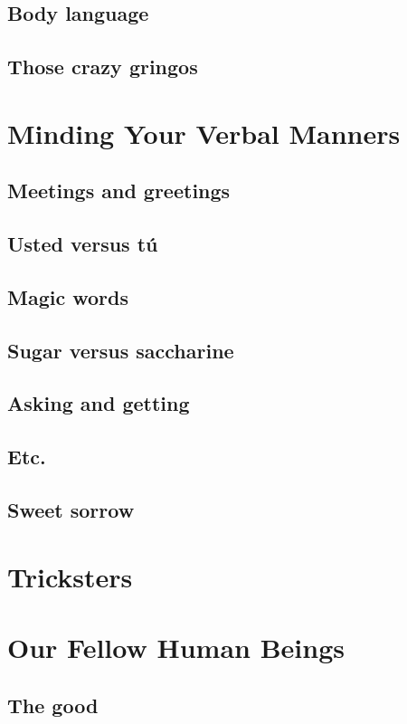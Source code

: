 \section{Body language}
\section{Those crazy gringos}

\chapter{Minding Your Verbal Manners}

\section{Meetings and greetings}
\section{Usted versus tú}
\section{Magic words}
\section{Sugar versus saccharine}
\section{Asking and getting}
\section{Etc.}
\section{Sweet sorrow}

\chapter{Tricksters}

\chapter{Our Fellow Human Beings}

\section{The good}
